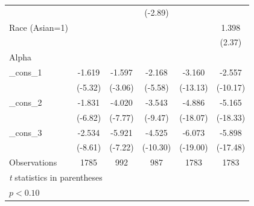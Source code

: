 {\begin{longtable}{l*{5}{c}}
                    &                   &                   &     (-2.89)       &                   &                   \\
Race (Asian=1)      &                   &                   &                   &                   &       1.398\sym{*}\\
                    &                   &                   &                   &                   &      (2.37)       \\
\midrule
Alpha               &                   &                   &                   &                   &                   \\
\_cons\_1             &      -1.619\sym{*}&      -1.597\sym{*}&      -2.168\sym{*}&      -3.160\sym{*}&      -2.557\sym{*}\\
                    &     (-5.32)       &     (-3.06)       &     (-5.58)       &    (-13.13)       &    (-10.17)       \\
\_cons\_2             &      -1.831\sym{*}&      -4.020\sym{*}&      -3.543\sym{*}&      -4.886\sym{*}&      -5.165\sym{*}\\
                    &     (-6.82)       &     (-7.77)       &     (-9.47)       &    (-18.07)       &    (-18.33)       \\
\_cons\_3             &      -2.534\sym{*}&      -5.921\sym{*}&      -4.525\sym{*}&      -6.073\sym{*}&      -5.898\sym{*}\\
                    &     (-8.61)       &     (-7.22)       &    (-10.30)       &    (-19.00)       &    (-17.48)       \\
\midrule
Observations        &        1785       &         992       &         987       &        1783       &        1783       \\
\bottomrule
\multicolumn{6}{l}{\footnotesize \textit{t} statistics in parentheses}\\
\multicolumn{6}{l}{\footnotesize \sym{*} \(p<0.10\)}\\
\end{longtable}
}
